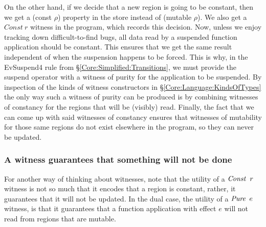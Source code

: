 On the other hand, if we decide that a new region is going to be constant, then we get a (const $\rho$) property in the store instead of (mutable $\rho$). We also get a $Const \ r$ witness in the program, which records this decision. Now, unless we enjoy tracking down difficult-to-find bugs, all data read by a suspended function application should be constant. This ensures that we get the same result independent of when the suspension happens to be forced. This is why, in the EvSuspend4 rule from \S\ref{Core:Simplified:Transitions}, we must provide the suspend operator with a witness of purity for the application to be suspended. By inspection of the kinds of witness constructors in \S\ref{Core:Language:KindsOfTypes} the only way such a witness of purity can be produced is by combining witnesses of constancy for the regions that will be (visibly) read. Finally, the fact that we can come up with said witnesses of constancy ensures that witnesses of mutability for those same regions do not exist elsewhere in the program, so they can never be updated. 


\subsubsection{A witness guarantees that something will not be done}
For another way of thinking about witnesses, note that the utility of a $\operatorname{\mathit{Const}} \ r$ witness is not so much that it encodes that a region is constant, rather, it guarantees that it will not be updated. In the dual case, the utility of a $\operatorname{\mathit{Pure}} \ e$ witness, is that it guarantees that a function application with effect $e$ will not read from regions that are mutable.










